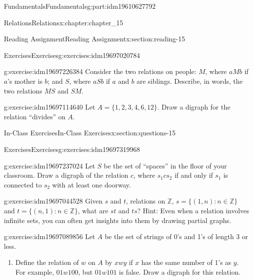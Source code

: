 \documentclass[oneside,10pt,]{book}
\numberwithin{equation}{section}
\begin{document}
\begin{partptx}{Fundamentals}{}{Fundamentals}{}{}{g:part:idm19610627792}
\begin{chapterptx}{Relations}{}{Relations}{}{}{x:chapter:chapter_15}
\begin{sectionptx}{Reading Assignment}{}{Reading Assignment}{}{}{x:section:reading-15}
\begin{exercises-subsection-numberless}{Exercises}{}{Exercises}{}{}{g:exercises:idm19697020784}
\begin{exercisegroup}
\begin{divisionexerciseeg}{1}{}{}{g:exercise:idm19697226384}
Consider the two relations on people: \(M\), where \(aMb\) if \(a\)'s mother is \(b\); and \(S\), where  \(aSb\) if \(a\) and \(b\) are siblings.  Describe, in words, the two relations \(MS\) and \(SM\).%
\end{divisionexerciseeg}%
\begin{divisionexerciseeg}{2}{}{}{g:exercise:idm19697114640}%
Let \(A = \{1,2,3,4,6,12\}\).  Draw a digraph for the relation ``divides'' on \(A\).%
\end{divisionexerciseeg}%
\end{exercisegroup}
\par\medskip\noindent
\end{exercises-subsection-numberless}
\end{sectionptx}
%
%
\typeout{************************************************}
\typeout{************************************************}
%
\begin{sectionptx}{In-Class Exercises}{}{In-Class Exercises}{}{}{x:section:questions-15}
%
%
%
\typeout{************************************************}
\typeout{************************************************}
%
\begin{exercises-subsection-numberless}{Exercises}{}{Exercises}{}{}{g:exercises:idm19697319968}
\par\medskip\noindent%
%
\begin{exercisegroup}
\begin{divisionexerciseeg}{1}{}{}{g:exercise:idm19697237024}%
Let \(S\) be the set of ``spaces'' in the floor of your classroom.   Draw a digraph of the relation \(c\), where \(s_1 c s_2\) if and only if \(s_1\) is connected to \(s_2\) with at least one doorway.%
\end{divisionexerciseeg}%
\begin{divisionexerciseeg}{2}{}{}{g:exercise:idm19697044528}%
Given \(s\) and \(t\), relations on \(\mathbb{Z}\), \(s = \{(1, n) : n \in \mathbb{Z}\}\) and \(t= \{(n, 1) : n \in  \mathbb{Z}\}\), what are \(st\) and \(ts\)? Hint: Even when a relation involves infinite sets, you can often get insights into them by drawing partial graphs.%
\end{divisionexerciseeg}%
\begin{divisionexerciseeg}{3}{}{}{g:exercise:idm19697089856}%
Let \(A\) be the set of strings of 0's and 1's of length 3 or less.%
\begin{enumerate}[label=(\alph*)]
\item{}Define the relation of \(w\) on \(A\) by \(x w y\) if \(x\) has the same number of 1's as \(y\). For example, \(01 w 100\), but \(01 w 101\) is false. Draw a digraph for this relation.%

\end{enumerate}
\end{divisionexerciseeg}
\end{exercisegroup}
\end{exercises-subsection-numberless}
\end{sectionptx}
\end{chapterptx}
\end{partptx}
\end{document}
